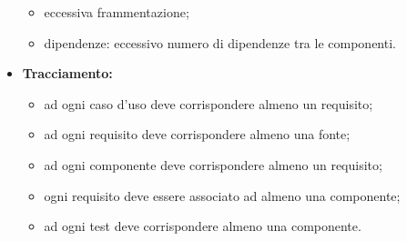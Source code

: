 \begin{itemize}
\begin{itemize}
		\item eccessiva frammentazione;
		\item dipendenze: eccessivo numero di dipendenze tra le componenti.
	\end{itemize}
	\item \textbf{Tracciamento:}
	\begin{itemize}
		\item ad ogni caso d'uso deve corrispondere almeno un requisito;
		\item ad ogni requisito deve corrispondere almeno una fonte;
		\item ad ogni componente deve corrispondere almeno un requisito;
		\item ogni requisito deve essere associato ad almeno una componente;
		\item ad ogni test deve corrispondere almeno una componente.
	\end{itemize}
	
\end{itemize}

